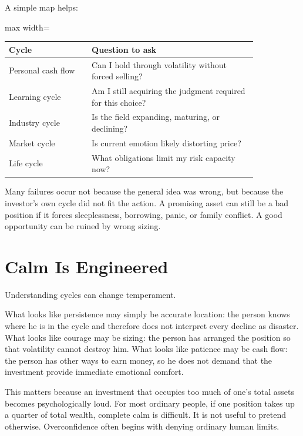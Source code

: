 A simple map helps:

\begin{center}
\begin{adjustbox}{max width=\linewidth}
\begin{tabular}{p{0.28\linewidth}p{0.56\linewidth}}
\hline
Cycle & Question to ask \\
\hline
Personal cash flow & Can I hold through volatility without forced selling? \\
Learning cycle & Am I still acquiring the judgment required for this choice? \\
Industry cycle & Is the field expanding, maturing, or declining? \\
Market cycle & Is current emotion likely distorting price? \\
Life cycle & What obligations limit my risk capacity now? \\
\hline
\end{tabular}
\end{adjustbox}
\end{center}

Many failures occur not because the general idea was wrong, but because the investor's own cycle did not fit the action. A promising asset can still be a bad position if it forces sleeplessness, borrowing, panic, or family conflict. A good opportunity can be ruined by wrong sizing.

\section*{Calm Is Engineered}

Understanding cycles can change temperament.

What looks like persistence may simply be accurate location: the person knows where he is in the cycle and therefore does not interpret every decline as disaster. What looks like courage may be sizing: the person has arranged the position so that volatility cannot destroy him. What looks like patience may be cash flow: the person has other ways to earn money, so he does not demand that the investment provide immediate emotional comfort.

This matters because an investment that occupies too much of one's total assets becomes psychologically loud. For most ordinary people, if one position takes up a quarter of total wealth, complete calm is difficult. It is not useful to pretend otherwise. Overconfidence often begins with denying ordinary human limits.

